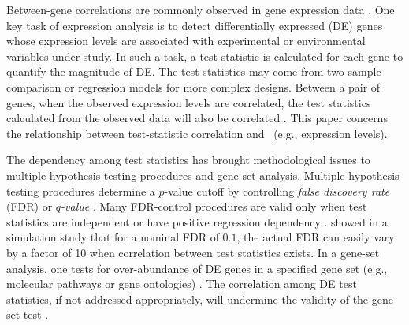 Between-gene correlations are commonly observed in gene expression 
data \citep{efron2012large1, gatti2010heading, 
	huang2013gene,qiu2005effects,storey2003positive}.
One key task of expression analysis is to detect differentially expressed (DE) genes whose 
expression levels are associated with experimental or environmental variables under study. 
In such a task, a test statistic is calculated for each gene to quantify the magnitude of DE. 
The test statistics may come from two-sample comparison or regression models for more complex 
designs. Between a pair of genes, when the observed expression levels are correlated, the test 
statistics calculated from the observed data will also be correlated 
\citep{barry2008statistical, efron2007correlation, wu2012camera}. This paper concerns the 
relationship between test-statistic correlation and \popucor~(e.g., expression levels).

The dependency among test statistics has brought methodological issues to multiple hypothesis 
testing procedures and gene-set analysis. 
Multiple hypothesis testing procedures determine a $p$-value cutoff by controlling 
\textit{false discovery rate} (FDR) 
\citep{benjamini1995controlling} or 
\textit{$q$-value} \citep{storey2003positive}. 
Many FDR-control procedures are valid only 
when test statistics are independent \citep{benjamini1995controlling} or 
have positive regression dependency \citep{benjamini2001control}. 
\citet{efron2007correlation} showed in a simulation study that for a nominal FDR of 
$0.1$, the actual FDR can easily vary by a factor of 10 when correlation between test 
statistics exists. 
In a gene-set analysis, one tests for over-abundance of DE genes in a
specified gene set (e.g., molecular pathways or gene ontologies) \citep{goeman2007analyzing}. 
The correlation among DE test statistics, if not addressed appropriately, will undermine 
the validity of the gene-set test \citep{gatti2010heading, wu2012camera}. 

